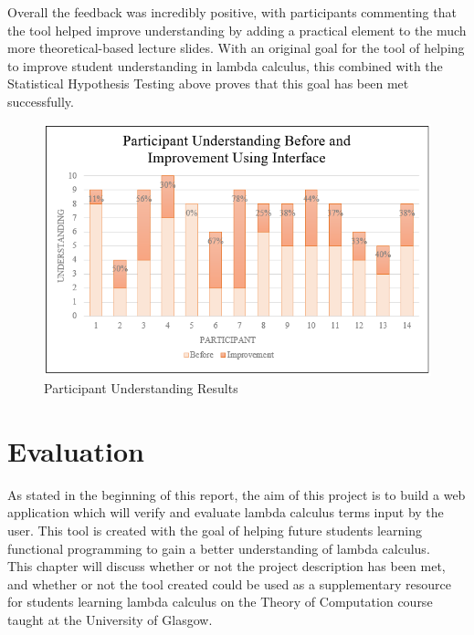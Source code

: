 \documentclass[a4paper,11pt]{report}
\begin{document}
Overall the feedback was incredibly positive, with participants commenting that the tool helped improve understanding by adding a practical element to the much more theoretical-based lecture slides. With an original goal for the tool of helping to improve student understanding in lambda calculus, this combined with the Statistical Hypothesis Testing above proves that this goal has been met successfully.


\begin{figure}[h]
	\includegraphics[scale=0.9]{images/participant_understanding}
	\centering
	\caption{Participant Understanding Results}
	\label{participant_understanding}
\end{figure}

\chapter{Evaluation}

As stated in the beginning of this report, the aim of this project is to build a web application which will verify and evaluate lambda calculus terms input by the user. This tool is created with the goal of helping future students learning functional programming to gain a better understanding of lambda calculus.\\

This chapter will discuss whether or not the project description has been met, and whether or not the tool created could be used as a supplementary resource for students learning lambda calculus on the Theory of Computation course taught at the University of Glasgow.
\end{document}
